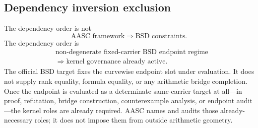 \documentclass[11pt]{article}
\begin{document}
\subsection*{Dependency inversion exclusion}
The dependency order is not
\[
\text{AASC framework} \Rightarrow \text{BSD constraints}.
\]
The dependency order is
\[
\begin{aligned}
&\text{non-degenerate fixed-carrier BSD endpoint regime}\\
&\Rightarrow \text{kernel governance already active}.
\end{aligned}
\]
The official BSD target fixes the curvewise endpoint slot under evaluation. It does not supply rank equality, formula equality, or any arithmetic bridge completion. Once the endpoint is evaluated as a determinate same-carrier target at all---in proof, refutation, bridge construction, counterexample analysis, or endpoint audit---the kernel roles are already required. AASC names and audits those already-necessary roles; it does not impose them from outside arithmetic geometry.
\end{document}
